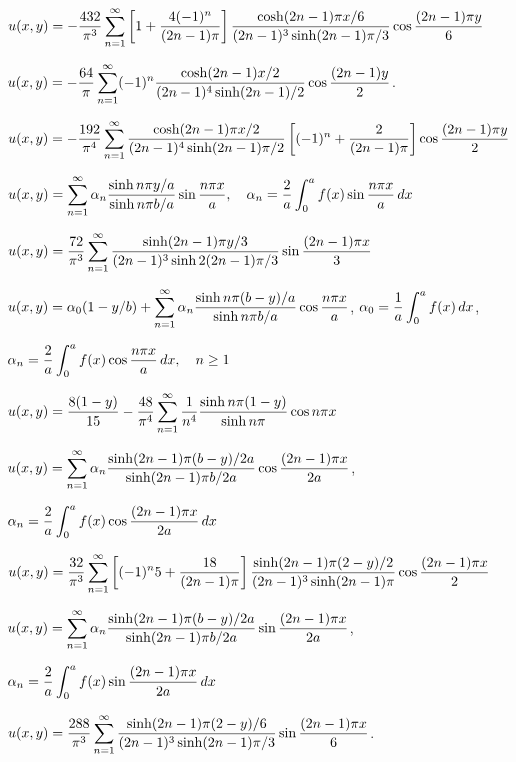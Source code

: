 $u(x,y)=-\displaystyle\frac{432}{\pi^{3}}\sum_{n=1}^{\infty}
\left[1+\frac{4(-1)^{n}}{(2n-1)\pi}\right]
{\frac{\cosh(2n-1)\pi x/6}{(2n-1)^{3}\sinh(2n-1)\pi/3}}
\cos\frac{(2n-1)\pi
y}{6}$

$u(x,y)=-\displaystyle
\frac{64}{\pi}\sum_{n=1}^{\infty}(-1)^{n}\frac{\cosh(2n-1)x/2}{(2n-1)^{4}\sinh(2n-1)/2}\cos\frac{(2n-1)y}{2}$.

$u(x,y)=-\displaystyle\frac{192}{\pi^{4}}\sum_{n=1}^{\infty}
\frac{\cosh(2n-1)\pi x/2}{(2n-1)^{4}\sinh(2n-1)\pi/2}
\left[(-1)^{n}+\frac{2}{(2n-1)\pi}\right]
\cos\frac{(2n-1)\pi y}{2}$

$\displaystyle u(x,y)=\sum_{n=1}^{\infty}\alpha_{n}\frac{\sinh n\pi y/a}{\sinh n\pi b/a}\sin
\frac{n\pi x}{a},\quad
\alpha_{n}=\frac{2}{a}\int_{0}^{a}f(x)\sin
\frac{n\pi x}{a}\,dx$

\quad \quad $u(x,y)=\displaystyle\frac{72}{\pi^{3}}\sum_{n=1}^{\infty}
\frac{\sinh(2n-1)\pi y/3}{(2n-1)^{3}\sinh2(2n-1)\pi/3}
\sin\frac{(2n-1)\pi x}{3}$

$\displaystyle
u(x,y)=\alpha_{0}(1-y/b)+\sum_{n=1}^{\infty}\alpha_{n}\frac{\sinh n\pi(b-y)/
a}{\sinh n\pi b/a}\cos
\frac{n\pi x}{a}$, \quad
$\displaystyle\alpha_{0}=\frac{1}{a}\int_{0}^{a}f(x)\,dx$,

\quad \quad$\displaystyle\alpha_{n}=\frac{2}{a}\int_{0}^{a}f(x)\cos
\frac{n\pi x}{a}\,dx,\quad n\ge1$

\quad \quad$\displaystyle u(x,y)=\frac{8(1-y)}{15}-\frac{48}{\pi^{4}}\sum_{n=1}^{\infty}\frac{1}{n^{4}}\frac{\sinh n\pi(1-y)}{\sinh n\pi}\cos n\pi x$

$\displaystyle
u(x,y)=\sum_{n=1}^{\infty}\alpha_{n}\frac{\sinh(2n-1)\pi(b-y)/2a}{\sinh(2n-1)\pi b/2a}\cos
\frac{(2n-1)\pi x}{2a}$,

\quad \quad$\displaystyle\alpha_{n}=\frac{2}{a}\int_{0}^{a}
f(x)\cos\frac{(2n-1)\pi x}{2a}\,dx$

\quad \quad$u(x,y)=\displaystyle
\frac{32}{\pi^{3}}\sum_{n=1}^{\infty}\left[(-1)^{n}5+\frac{18}{(2n-1)\pi}\right]{\frac{\sinh(2n-1)\pi(2-y)/2}{(2n-1)^{3}\sinh(2n-1)\pi}}\cos\frac{(2n-1)\pi x}{2}$

$\displaystyle
u(x,y)=\sum_{n=1}^{\infty}\alpha_{n}\frac{\sinh(2n-1)\pi(b-y)/2a}{\sinh(2n-1)\pi b/2a}\sin
\frac{(2n-1)\pi x}{2a}$,

\quad \quad$\displaystyle\alpha_{n}=\frac{2}{a}\int_{0}^{a}
f(x)\sin\frac{(2n-1)\pi x}{2a}\,dx$

\quad \quad$u(x,y)=\displaystyle\frac{288}{\pi^{3}}\sum_{n=1}^{\infty}\frac{\sinh(2n-1)\pi(2-y)/6}{(2n-1)^{3}\sinh(2n-1)\pi/3}\sin\frac{(2n-1)\pi x}{6}$.

